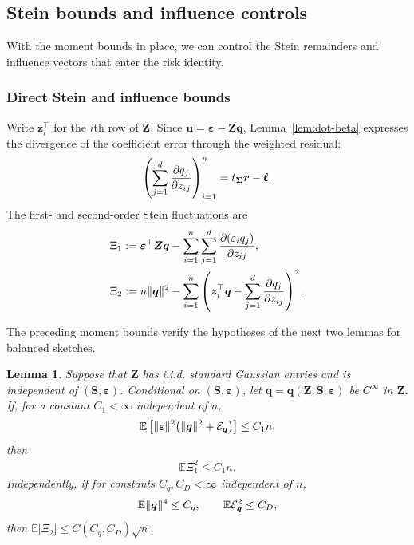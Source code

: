 \documentclass{article}
\theoremstyle{plain}
\newtheorem{lemma}[theorem]{Lemma}
\theoremstyle{definition}
\theoremstyle{definition}
\DeclarePairedDelimiter\norm{\lVert}{\rVert}
\def\E{{\mathbb{E}}}
\def\mathbold{\boldsymbol}
\def\bell{\mathbold{\ell}}\def\ellhat{\widehat{\ell}}\def\elltil{\widetilde{\ell}}\def\ellbar{{\overline \ell}}
\def\bq{\mathbold{q}}\def\qhat{\widehat{q}}\def\qtil{\widetilde{q}}\def\qbar{{\overline q}}
\def\br{\mathbold{r}}\def\rhat{\widehat{r}}\def\rtil{\widetilde{r}}\def\rbar{{\overline r}}
\def\bS{\mathbold{S}}\def\hbS{{\widehat{\bS}}}\def\tbS{{\widetilde{\bS}}}
\def\bu{\mathbold{u}}\def\uhat{\widehat{u}}\def\util{\widetilde{u}}\def\ubar{{\overline u}}
\def\bz{\mathbold{z}}\def\zhat{\widehat{z}}\def\ztil{\widetilde{z}}\def\zbar{{\overline z}}
\def\bZ{\mathbold{Z}}\def\hbZ{{\widehat{\bZ}}}\def\tbZ{{\widetilde{\bZ}}}
\def\ep{\varepsilon}\def\eps{\epsilon}\def\veps{\varepsilon}
\def\bep{ {\mathbold{\ep} }}
\def\bSigma{\mathbold{\Sigma}}\def\hbSigma{{\widehat{\bSigma}}}
\begin{document}
\subsection{Stein bounds and influence controls}

With the moment bounds in place, we can control the Stein remainders and
influence vectors that enter the risk identity.

\subsubsection{Direct Stein and influence bounds}
\label{app:stein-auxiliary-results}

Write $\bz_i^\top$ for the $i$th row of $\bZ$. Since
$\bu=\bep-\bZ\bq$, Lemma~\ref{lem:dot-beta} expresses the divergence
of the coefficient error through the weighted residual:
\begin{align}
    \left(\sum_{j=1}^d\pdv{q_j}{z_{ij}}\right)_{i=1}^n
    =t_{\bSigma}\br-\bell.
    \label{eq:whitened-divergence}
\end{align}
The first- and second-order Stein fluctuations are
\begin{align*}
    \Xi_1
    &:=\bep^\top\bZ\bq
       -\sum_{i=1}^n\sum_{j=1}^d
          \pdv{(\varepsilon_i q_j)}{z_{ij}},\\
    \Xi_2
    &:=n\norm{\bq}^2
       -\sum_{i=1}^n\left(
          \bz_i^\top\bq-\sum_{j=1}^d\pdv{q_j}{z_{ij}}
       \right)^2.
\end{align*}

The preceding moment bounds verify the hypotheses of the next two lemmas
for balanced sketches.

\begin{lemma}
\label{lem:Stein-remainders-from-moments}
Suppose that $\bZ$ has i.i.d. standard Gaussian entries and is independent of
$(\bS,\bep)$. Conditional on $(\bS,\bep)$, let
$\bq=\bq(\bZ,\bS,\bep)$ be $C^\infty$ in $\bZ$.  If, for a constant $C_1<\infty$ independent of $n$,
\begin{align*}
    \E\left[\norm{\bep}^2
       \bigl(\norm{\bq}^2+\calE_{\bq}\bigr)\right]
       \leq C_1n,
\end{align*}
then
\begin{align*}
    \E\Xi_1^2\leq C_1n.
\end{align*}
Independently, if for constants $C_q,C_D<\infty$ independent of $n$,
\begin{align*}
    \E\norm{\bq}^4\leq C_q,
    \qquad
    \E\calE_{\bq}^2\leq C_D,
\end{align*}
then $\E|\Xi_2|\leq C(C_q,C_D)\sqrt n$.
\end{lemma}
\end{document}
